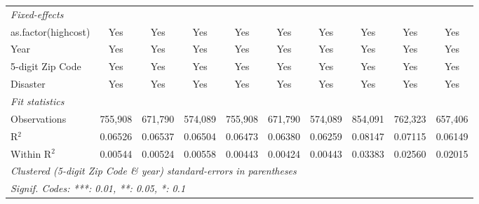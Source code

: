 \begin{tabular}{lccccccccc}
   \midrule
   \emph{Fixed-effects}\\
   as.factor(highcost)                                        & Yes                    & Yes            & Yes           & Yes           & Yes            & Yes          & Yes            & Yes            & Yes\\  
   Year                                                       & Yes                    & Yes            & Yes           & Yes           & Yes            & Yes          & Yes            & Yes            & Yes\\  
   5-digit Zip Code                                           & Yes                    & Yes            & Yes           & Yes           & Yes            & Yes          & Yes            & Yes            & Yes\\  
   Disaster                                                   & Yes                    & Yes            & Yes           & Yes           & Yes            & Yes          & Yes            & Yes            & Yes\\  
   \midrule
   \emph{Fit statistics}\\
   Observations                                               & 755,908                & 671,790        & 574,089       & 755,908       & 671,790        & 574,089      & 854,091        & 762,323        & 657,406\\  
   R$^2$                                                      & 0.06526                & 0.06537        & 0.06504       & 0.06473       & 0.06380        & 0.06259      & 0.08147        & 0.07115        & 0.06149\\  
   Within R$^2$                                               & 0.00544                & 0.00524        & 0.00558       & 0.00443       & 0.00424        & 0.00443      & 0.03383        & 0.02560        & 0.02015\\  
   \midrule \midrule
   \multicolumn{10}{l}{\emph{Clustered (5-digit Zip Code \& year) standard-errors in parentheses}}\\
   \multicolumn{10}{l}{\emph{Signif. Codes: ***: 0.01, **: 0.05, *: 0.1}}\\
\end{tabular}
\par\endgroup
